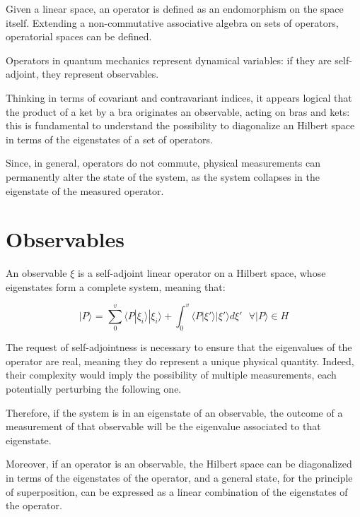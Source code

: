 \documentclass{article}
\begin{document}
Given a linear space, an operator is defined as an endomorphism on the space itself.
Extending a non-commutative associative algebra on sets of operators, operatorial spaces can be defined.

Operators in quantum mechanics represent dynamical variables: if they are self-adjoint, they represent observables.

Thinking in terms of covariant and contravariant indices, it appears logical that the product of a ket by a bra originates an observable, acting on bras and kets:
this is fundamental to understand the possibility to diagonalize an Hilbert space in terms of the eigenstates of a set of operators.

Since, in general, operators do not commute, physical measurements can permanently alter the state of the system, as the system collapses in the eigenstate of the measured operator.

\section{Observables}

\begin{tcolorbox}[colframe=gray!90, colback=blue!5, coltitle=white, title=\textbf{Definition: Observable}, fonttitle=\large\bfseries]
  An observable $\xi$ is a self-adjoint linear operator on a Hilbert space, whose eigenstates form a complete system, meaning that:

  \begin{equation}
    \text{$|P\rangle$ = $\sum_{0}^{v} \langle P|\xi_i\rangle |\xi_i\rangle  + \int_{0}^{v} \langle P|\xi'\rangle |\xi'\rangle d\xi'$  $\forall |P\rangle \in H$}
  \end{equation}
\end{tcolorbox}

The request of self-adjointness is necessary to ensure that the eigenvalues of the operator are real, meaning they do represent a unique physical quantity.
Indeed, their complexity would imply the possibility of multiple measurements, each potentially perturbing the following one.

Therefore, if the system is in an eigenstate of an observable, the outcome of a measurement of that observable will be the eigenvalue associated to that eigenstate.

Moreover, if an operator is an observable, the Hilbert space can be diagonalized in terms of the eigenstates of the operator, and a general state,
for the principle of superposition, can be expressed as a linear combination of the eigenstates of the operator.
\end{document}

